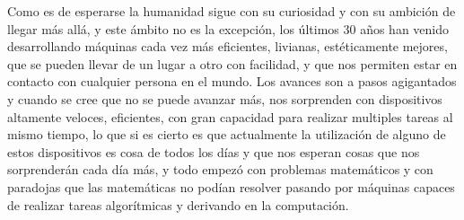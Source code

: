 \documentclass{article}
\begin{document}
Como es de esperarse la humanidad sigue con su curiosidad y con su ambición de llegar más allá, y este ámbito no es la excepción, los últimos 30 años han venido desarrollando máquinas cada vez más eficientes, livianas, estéticamente mejores, que se pueden llevar de un lugar a otro con facilidad, y que nos permiten estar en contacto con cualquier persona en el mundo. Los avances son a pasos agigantados y cuando se cree que no se puede avanzar más, nos sorprenden con dispositivos altamente veloces, eficientes, con gran capacidad para realizar multiples tareas al mismo tiempo, lo que si es cierto es que actualmente la utilización de alguno de estos dispositivos es cosa de todos los días y que nos esperan cosas que nos sorprenderán cada día más, y todo empezó con problemas matemáticos y con paradojas que las matemáticas no podían resolver pasando por máquinas capaces de realizar tareas algorítmicas y derivando en la computación.
\end{document}
